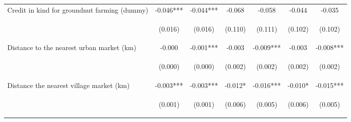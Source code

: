 \begin{center}
\begin{tabular}{lcccccc}
Credit in kind for groundnut farming (dummy) & -0.046*** & -0.044*** & -0.068 & -0.058 & -0.044 & -0.035 \\
\vspace{4pt} & \begin{footnotesize}(0.016)\end{footnotesize} & \begin{footnotesize}(0.016)\end{footnotesize} & \begin{footnotesize}(0.110)\end{footnotesize} & \begin{footnotesize}(0.111)\end{footnotesize} & \begin{footnotesize}(0.102)\end{footnotesize} & \begin{footnotesize}(0.102)\end{footnotesize} \\
Distance to the nearest urban market (km) & -0.000 & -0.001*** & -0.003 & -0.009*** & -0.003 & -0.008*** \\
\vspace{4pt} & \begin{footnotesize}(0.000)\end{footnotesize} & \begin{footnotesize}(0.000)\end{footnotesize} & \begin{footnotesize}(0.002)\end{footnotesize} & \begin{footnotesize}(0.002)\end{footnotesize} & \begin{footnotesize}(0.002)\end{footnotesize} & \begin{footnotesize}(0.002)\end{footnotesize} \\
Distance the nearest village market (km) & -0.003*** & -0.003*** & -0.012* & -0.016*** & -0.010* & -0.015*** \\
\vspace{4pt} & \begin{footnotesize}(0.001)\end{footnotesize} & \begin{footnotesize}(0.001)\end{footnotesize} & \begin{footnotesize}(0.006)\end{footnotesize} & \begin{footnotesize}(0.005)\end{footnotesize} & \begin{footnotesize}(0.006)\end{footnotesize} & \begin{footnotesize}(0.005)\end{footnotesize} \\

\end{tabular}
\end{center}
